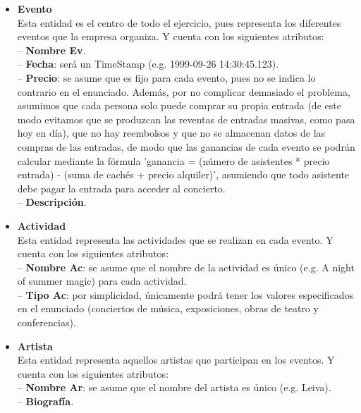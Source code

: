\documentclass[12pt]{article}
\begin{document}
    \begin{itemize}

        \item \textbf{Evento}\\
            Esta entidad es el centro de todo el ejercicio, pues representa los diferentes eventos que la empresa organiza.
            Y cuenta con los siguientes atributos: \\
                \hspace{0.5cm} -- {\bfseries Nombre Ev}. \\
                \hspace{0.5cm} -- {\bfseries Fecha}: será un TimeStamp (e.g. 1999-09-26 14:30:45.123). \\
                \hspace{0.5cm} -- {\bfseries Precio}: se asume que es fijo para cada evento, pues no se indica lo contrario en el enunciado. 
                Además, por no complicar demasiado el problema, asumimos que cada persona solo puede comprar su propia entrada (de este modo evitamos 
                que se produzcan las reventas de entradas masivas, como pasa hoy en día), que no hay reembolsos y que no se almacenan datos de las compras de 
                las entradas, de modo que las ganancias de cada evento se podrán calcular mediante la fórmula 
                'ganancia = (número de asistentes * precio entrada) - (suma de cachés + precio alquiler)', asumiendo que todo asistente debe pagar la entrada 
                para acceder al concierto. \\
                \hspace{0.5cm} -- {\bfseries Descripción}.

        \item \textbf{Actividad}\\
            Esta entidad representa las actividades que se realizan en cada evento. 
            Y cuenta con los siguientes atributos:\\
                \hspace{0.5cm} -- {\bfseries Nombre Ac}: se asume que el nombre de la actividad es único (e.g. A night of summer magic) para cada actividad. \\
                \hspace{0.5cm} -- {\bfseries Tipo Ac}: por simplicidad, únicamente podrá tener los valores especificados en el enunciado (conciertos de música, 
                exposiciones, obras de teatro y conferencias).

        \item \textbf{Artista}\\
            Esta entidad representa aquellos artistas que participan en los eventos. 
            Y cuenta con los siguientes atributos: \\
                \hspace{0.5cm} -- {\bfseries Nombre Ar}: se asume que el nombre del artista es único (e.g. Leiva). \\
                \hspace{0.5cm} -- {\bfseries Biografía}.


\end{itemize}
\end{document}
